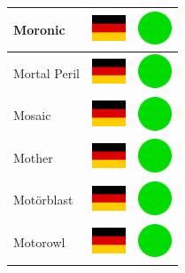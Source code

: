 \documentclass[12pt, a4paper, twoside]{report}
\begin{document}
\begin{center}
\begin{longtable}{|p{5cm}|p{2cm}|p{2cm}|}
 Moronic                                                    & \includegraphics[width=1cm]{../4x3/de} &   \includegraphics[width=1cm]{../likes/y} \\ \hline
 Mortal Peril                                               & \includegraphics[width=1cm]{../4x3/de} &   \includegraphics[width=1cm]{../likes/y} \\ \hline
 Mosaic                                                     & \includegraphics[width=1cm]{../4x3/de} &   \includegraphics[width=1cm]{../likes/y} \\ \hline
 Mother                                                     & \includegraphics[width=1cm]{../4x3/de} &   \includegraphics[width=1cm]{../likes/y} \\ \hline
 Motörblast                                                 & \includegraphics[width=1cm]{../4x3/de} &   \includegraphics[width=1cm]{../likes/y} \\ \hline
 Motorowl                                                   & \includegraphics[width=1cm]{../4x3/de} &   \includegraphics[width=1cm]{../likes/y} \\ \hline

\end{longtable}
\end{center}
\end{document}
